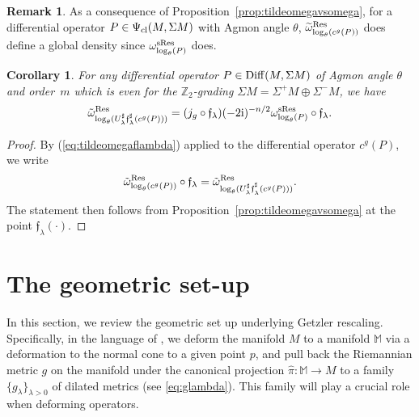 \documentclass[pdftex]{sigma}
\numberwithin{equation}{section}
\newtheorem{cor}[thm]{Corollary}
\theoremstyle{definition}
\newtheorem{rk}[thm]{Remark}
\newcommand{\Z}{\mathbb Z}
\newcommand{\M}{\mathbb M}
\begin{document}
\begin{rk}%
As a consequence of Proposition~\ref{prop:tildeomegavsomega}, for a differential operator $P\in \Psi_{\rm cl}(M, \Sigma M)$ with Agmon angle $\theta$, $\widetilde \omega^{\rm Res}_{\log_\theta (c^g(P))}$ does define a global density since $\omega^{\rm sRes}_{\log_\theta (P)}$ does.
\end{rk}

\begin{cor}\label{cor:relationomegatilde}
For any differential operator $P\in {\rm Diff}(M,\Sigma M)$ of Agmon angle $\theta$ and order~$m$ which is even for the $\Z_2$-grading $\Sigma M=\Sigma^+ M\oplus \Sigma^- M$, we have
\[\tilde \omega^{{\rm Res}}_{ \log _\theta (U_\lambda^\sharp {\mathfrak f}_{ \lambda}^\sharp ( c^g(P)))}=(j_g\circ {\mathfrak f}_{\lambda}) (-2{\rm i})^{-n/2}\omega^{ {\rm sRes}}_{\log _\theta (P)}\circ \mathfrak{f}_\lambda.\]
\end{cor}

\begin{proof} By (\ref{eq:tildeomegaflambda}) applied to the differential operator $c^g(P)$, we write
\begin{equation*}
		\tilde \omega^{\rm Res}_{\log _\theta (c^g(P))}\circ {\mathfrak f}_{ \lambda} = \tilde \omega^{ {\rm Res}}_{{ \log _\theta (U_\lambda^\sharp {\mathfrak f}}_{ \lambda}^\sharp ( c^g(P)))}.
 \end{equation*}
The statement then follows from Proposition~\ref{prop:tildeomegavsomega} at the point $\mathfrak{f}_\lambda(\cdot)$.
\end{proof}

\section{The geometric set-up} %
In this section, we review the geometric set up underlying Getzler rescaling. Specifically, in the language of \cite[Section~1.1]{DS1},
we deform the manifold $M$ to a manifold $\M$ via a deformation to the normal cone to a given point $p$, and pull back the Riemannian metric $g$ on the manifold under the canonical projection $\hat \pi\colon \M\to M$ to a family $\{g_\lambda\}_{\lambda>0}$ of dilated metrics (see \eqref{eq:glambda}). This family will play a crucial role when deforming operators.
\end{document}

